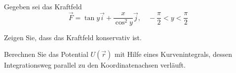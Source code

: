 \begin{atiTask}[
  title = Konservatives Vektorfeld
]
  Gegeben sei das Kraftfeld
  \begin{equation*}
  \vec{F}=\tan y\vec{i}+\frac{x}{\cos ^2 y}\vec{j}, \quad -\frac{\pi}{2}<y<\frac{\pi}{2}
  \end{equation*}
 \begin{atiSubtasks}
 \item Zeigen Sie, dass das Kraftfeld konservativ ist.
 \item Berechnen Sie das Potential $U(\vec{r})$ mit Hilfe eines Kurvenintegrals, dessen Integrationsweg parallel zu den Koordinatenachsen verläuft.
 \end{atiSubtasks}
\end{atiTask}
